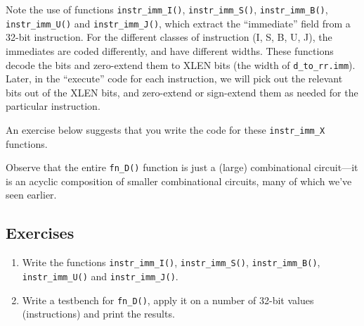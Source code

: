 Note the use of functions \verb|instr_imm_I()|, \verb|instr_imm_S()|,
\verb|instr_imm_B()|, \verb|instr_imm_U()| and \verb|instr_imm_J()|,
which extract the ``immediate'' field from a 32-bit instruction.  For
the different classes of instruction (I, S, B, U, J), the immediates
are coded differently, and have different widths.  These functions
decode the bits and zero-extend them to XLEN bits (the width of
\verb|d_to_rr.imm|).  Later, in the ``execute'' code for each
instruction, we will pick out the relevant bits out of the XLEN bits,
and zero-extend or sign-extend them as needed for the particular
instruction.

An exercise below suggests that you write the code for these
\verb|instr_imm_X| functions.

Observe that the entire \verb|fn_D()| function is just a (large)
combinational circuit---it is an acyclic composition of smaller
combinational circuits, many of which we've seen earlier.


\subsection{Exercises}

\begin{enumerate}

\item Write the functions \verb|instr_imm_I()|, \verb|instr_imm_S()|,
  \verb|instr_imm_B()|, \verb|instr_imm_U()| and \verb|instr_imm_J()|.

\item Write a testbench for \verb|fn_D()|, apply it on a number of
  32-bit values (instructions) and print the results.

\end{enumerate}

